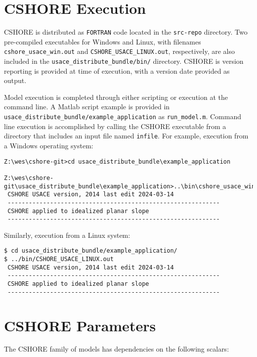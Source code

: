\documentclass[11pt,oneside]{book}
\begin{document}
\section*{CSHORE Execution}
CSHORE is distributed as \verb+FORTRAN+ code located in the
\verb+src-repo+ directory.  Two pre-compiled executables for Windows
and Linux, with filenames \verb+cshore_usace_win.out+ and
\verb+CSHORE_USACE_LINUX.out+, respectively, are also included in the
\verb+usace_distribute_bundle/bin/+ directory.  CSHORE is version
reporting is provided at time of execution, with a version date provided as output.

Model execution is completed through either scripting or execution at
the command line.  A Matlab script example is provided in
\verb+usace_distribute_bundle/example_application+ as
\verb+run_model.m+.  Command line execution is accomplished by calling
the CSHORE executable from a directory that includes an input file
named \verb+infile+.  For example, execution from a Windows operating system:
\begin{verbatim}
Z:\wes\cshore-git>cd usace_distribute_bundle\example_application

Z:\wes\cshore-git\usace_distribute_bundle\example_application>..\bin\cshore_usace_win.out
 CSHORE USACE version, 2014 last edit 2024-03-14
 ------------------------------------------------------------
 CSHORE applied to idealized planar slope
 ------------------------------------------------------------
\end{verbatim}

Similarly, execution from a Linux system:

\begin{verbatim}
$ cd usace_distribute_bundle/example_application/
$ ../bin/CSHORE_USACE_LINUX.out 
 CSHORE USACE version, 2014 last edit 2024-03-14                       
 ------------------------------------------------------------          
 CSHORE applied to idealized planar slope                              
 ------------------------------------------------------------          
\end{verbatim}

\section*{CSHORE Parameters}

\noindent The CSHORE family of models has dependencies on the following scalars:
\end{document}
